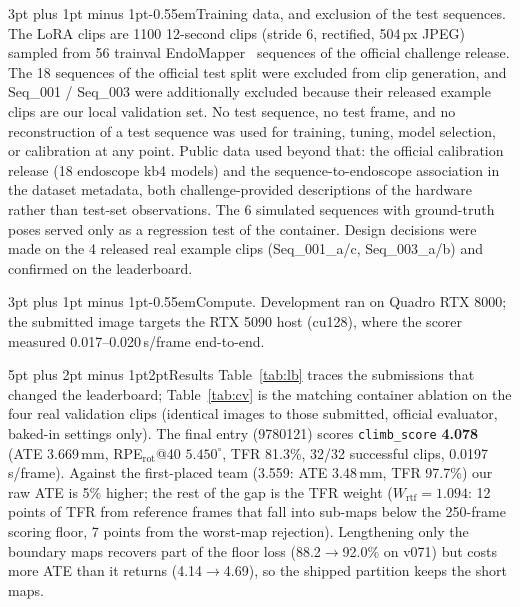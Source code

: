 \documentclass[10pt,a4paper]{article}
\makeatletter
\renewcommand\section{\@startsection{section}{1}{\z@}%
  {5pt plus 2pt minus 1pt}{2pt}{\normalfont\large\bfseries}}
\renewcommand\paragraph{\@startsection{paragraph}{4}{\z@}%
  {3pt plus 1pt minus 1pt}{-0.55em}{\normalfont\bfseries}}
\makeatother
\begin{document}
\paragraph{Training data, and exclusion of the test sequences.}
The LoRA clips are 1100 12-second clips (stride 6, rectified, 504\,px JPEG) sampled from 56 trainval
EndoMapper~\cite{endomapper} sequences of the official challenge release. The 18 sequences of the
official test split were excluded from clip generation, and Seq\_001 / Seq\_003 were additionally
excluded because their released example clips are our local validation set. No test sequence, no
test frame, and no reconstruction of a test sequence was used for training, tuning, model selection,
or calibration at any point. Public data used beyond that: the official calibration release (18
endoscope kb4 models) and the sequence-to-endoscope association in the dataset metadata, both
challenge-provided descriptions of the hardware rather than test-set observations. The 6 simulated
sequences with ground-truth poses served only as a regression test of the container. Design
decisions were made on the 4 released real example clips (Seq\_001\_a/c, Seq\_003\_a/b) and
confirmed on the leaderboard.

\paragraph{Compute.}
Development ran on Quadro RTX 8000; the submitted image targets the RTX 5090 host (cu128), where
the scorer measured 0.017--0.020\,s/frame end-to-end.

\section{Results}
Table~\ref{tab:lb} traces the submissions that changed the leaderboard; Table~\ref{tab:cv} is the
matching container ablation on the four real validation clips (identical images to those submitted,
official evaluator, baked-in settings only). The final entry (9780121) scores
\texttt{climb\_score} \textbf{4.078} (ATE 3.669\,mm, RPE$_{\text{rot}}$@40 $5.450^\circ$, TFR 81.3\%,
32/32 successful clips, 0.0197\,s/frame). Against the first-placed team (3.559: ATE 3.48\,mm,
TFR 97.7\%) our raw ATE is 5\% higher; the rest of the gap is the TFR weight
($W_{\text{rtf}}=1.094$: 12 points of TFR from reference frames that fall into sub-maps below the
250-frame scoring floor, 7 points from the worst-map rejection). Lengthening only the boundary
maps recovers part of the floor loss (88.2$\to$92.0\% on v071) but costs more ATE than it returns
(4.14$\to$4.69), so the shipped partition keeps the short maps.
\end{document}
